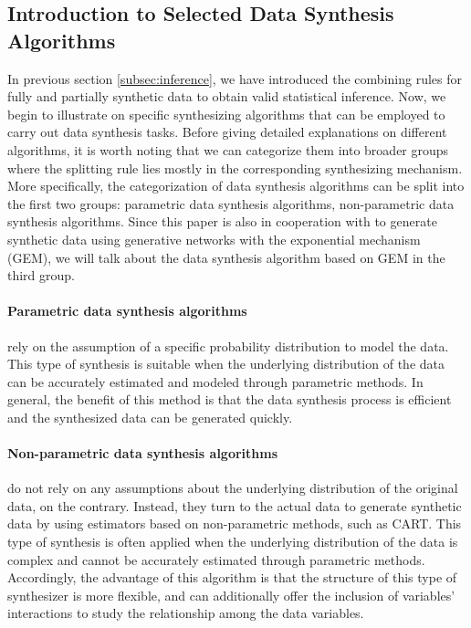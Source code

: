 \subsection{Introduction to Selected Data Synthesis Algorithms}
\label{subsec:detailsynmethods}
In previous section \ref{subsec:inference}, we have introduced the combining rules for fully and partially synthetic data to obtain valid statistical inference. Now, we begin to illustrate on specific synthesizing algorithms that can be employed to carry out data synthesis tasks. Before giving detailed explanations on different algorithms, it is worth noting that we can categorize them into broader groups where the splitting rule lies mostly in the corresponding synthesizing mechanism. More specifically, the categorization of data synthesis algorithms can be split into the first two groups: parametric data synthesis algorithms, non-parametric data synthesis algorithms. Since this paper is also in cooperation with \citet{liu2021iterative} to generate synthetic data using generative networks with the exponential mechanism (GEM), we will talk about the data synthesis algorithm based on GEM in the third group.

\paragraph{Parametric data synthesis algorithms}rely on the assumption of a specific probability distribution to model the data. This type of synthesis is suitable when the underlying distribution of the data can be accurately estimated and modeled through parametric methods. In general, the benefit of this method is that the data synthesis process is efficient and the synthesized data can be generated quickly.

\paragraph{Non-parametric data synthesis algorithms}do not rely on any assumptions about the underlying distribution of the original data, on the contrary. Instead, they turn to the actual data to generate synthetic data by using estimators based on non-parametric methods, such as CART. This type of synthesis is often applied when the underlying distribution of the data is complex and cannot be accurately estimated through parametric methods. Accordingly, the advantage of this algorithm is that the structure of this type of synthesizer is more flexible, and can additionally offer the inclusion of variables' interactions to study the relationship among the data variables.

